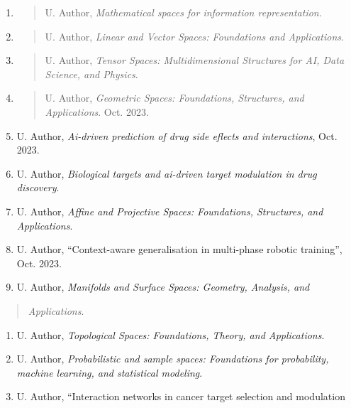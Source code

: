 \documentclass[
]{article}
\begin{document}
\begin{enumerate}
\def\labelenumi{\arabic{enumi}.}
\setcounter{enumi}{5}
\item
  \begin{quote}
  \protect\hypertarget{_bookmark46}{}{}U. Author, \emph{Mathematical
  spaces for information representation}.
  \end{quote}
\item
  \begin{quote}
  \protect\hypertarget{_bookmark47}{}{}U. Author, \emph{Linear and
  Vector Spaces: Foundations and Applications}.
  \end{quote}
\item
  \begin{quote}
  \protect\hypertarget{_bookmark48}{}{}U. Author, \emph{Tensor Spaces:
  Multidimensional Structures for AI, Data Science, and Physics}.
  \end{quote}
\item
  \begin{quote}
  \protect\hypertarget{_bookmark49}{}{}U. Author, \emph{Geometric
  Spaces: Foundations, Structures, and Applications}. Oct. 2023.
  \end{quote}
\item
  \protect\hypertarget{_bookmark50}{}{}U. Author, \emph{Ai-driven
  prediction of drug side eflects and interactions}, Oct. 2023.
\item
  \protect\hypertarget{_bookmark51}{}{}U. Author, \emph{Biological
  targets and ai-driven target modulation in drug discovery}.
\item
  \protect\hypertarget{_bookmark52}{}{}U. Author, \emph{Affine and
  Projective Spaces: Foundations, Structures, and Applications}.
\item
  \protect\hypertarget{_bookmark53}{}{}U. Author, ``Context-aware
  generalisation in multi-phase robotic training'', Oct. 2023.
\item
  \protect\hypertarget{_bookmark54}{}{}U. Author, \emph{Manifolds and
  Surface Spaces: Geometry, Analysis, and}
\end{enumerate}

\begin{quote}
\emph{Applications}.
\end{quote}

\begin{enumerate}
\def\labelenumi{\arabic{enumi}.}
\setcounter{enumi}{14}
\item
  \protect\hypertarget{_bookmark55}{}{}U. Author, \emph{Topological
  Spaces: Foundations, Theory, and Applications}.
\item
  \protect\hypertarget{_bookmark56}{}{}U. Author, \emph{Probabilistic
  and sample spaces: Foundations for probability, machine learning, and
  statistical modeling}.
\item
  \protect\hypertarget{_bookmark57}{}{}U. Author, ``Interaction networks
  in cancer target selection and modulation
\end{enumerate}
\end{document}
